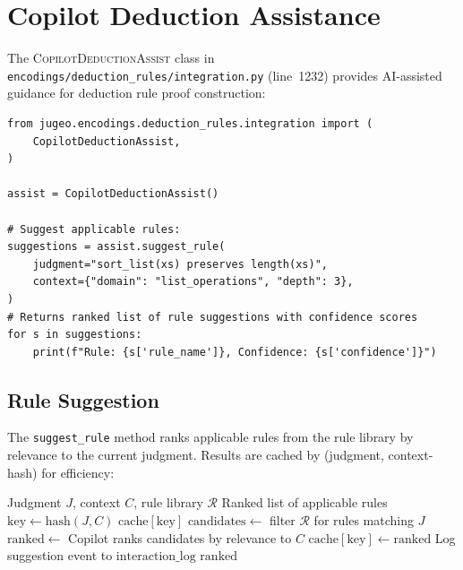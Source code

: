 \documentclass[11pt]{article}
\newcommand{\DeducAssist}{\textsc{CopilotDeductionAssist}}
\newcommand{\rulelib}{\mathcal{R}}
\begin{document}
\section{Copilot Deduction Assistance}\label{sec:deduction}

The \DeducAssist{} class in \texttt{encodings/deduction\_rules/integration.py}
(line~1232) provides AI-assisted guidance for deduction rule proof
construction:

\begin{lstlisting}[style=jugeo-python]
from jugeo.encodings.deduction_rules.integration import (
    CopilotDeductionAssist,
)

assist = CopilotDeductionAssist()

# Suggest applicable rules:
suggestions = assist.suggest_rule(
    judgment="sort_list(xs) preserves length(xs)",
    context={"domain": "list_operations", "depth": 3},
)
# Returns ranked list of rule suggestions with confidence scores
for s in suggestions:
    print(f"Rule: {s['rule_name']}, Confidence: {s['confidence']}")
\end{lstlisting}

\subsection{Rule Suggestion}

The \texttt{suggest\_rule} method ranks applicable rules from the rule library
by relevance to the current judgment.  Results are cached by
(judgment, context-hash) for efficiency:

\begin{algorithm}[h]
\caption{Copilot Rule Suggestion}
\label{alg:suggest}
\begin{algorithmic}[1]
\REQUIRE Judgment $J$, context $C$, rule library $\rulelib$
\ENSURE Ranked list of applicable rules
\STATE $\mathrm{key} \gets \mathrm{hash}(J, C)$
  \RETURN $\mathrm{cache}[\mathrm{key}]$
\ENDIF
\STATE $\mathrm{candidates} \gets$ filter $\rulelib$ for rules matching $J$
\STATE $\mathrm{ranked} \gets$ Copilot ranks candidates by relevance to $C$
\STATE $\mathrm{cache}[\mathrm{key}] \gets \mathrm{ranked}$
\STATE Log suggestion event to $\mathrm{interaction\_log}$
\RETURN $\mathrm{ranked}$
\end{algorithmic}
\end{algorithm}
\end{document}
